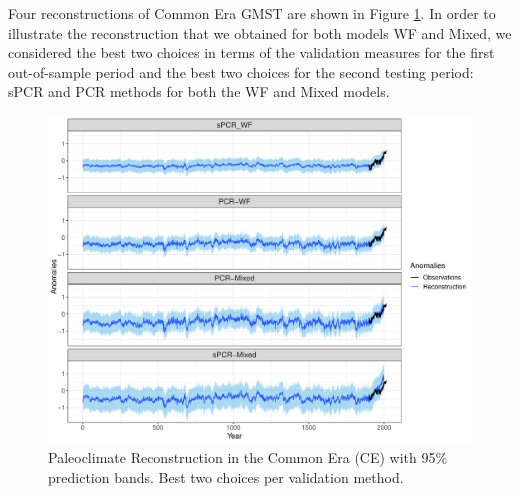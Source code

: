 \documentclass[12pt]{amsart}
\theoremstyle{plain}
\theoremstyle{definition}
\theoremstyle{remark}
\newcommand{\lb}[1]{\color{MidnightBlue}\textbf{[LB: #1]}\normalcolor}
\newcommand{\jeg}[1]{\color{ProcessBlue}\textbf{[JEG: #1]}\normalcolor}
\begin{document}
 Four reconstructions of Common Era GMST
are shown in Figure \ref{fig:paleoCE1}.
In order to illustrate the reconstruction that we obtained for both models WF and Mixed, we considered the best two choices in terms of the validation measures for the
first out-of-sample period  and the best two choices for the second testing
period: sPCR and PCR methods for both the WF and Mixed models.

\begin{figure}[h!]
  \centering
  \includegraphics[scale=0.40]{RecCE_Final}
  \caption{Paleoclimate Reconstruction in the Common Era (CE) with 95\%
    prediction bands. Best two choices per validation method.}
  \label{fig:paleoCE1}
\end{figure}

\end{document}
